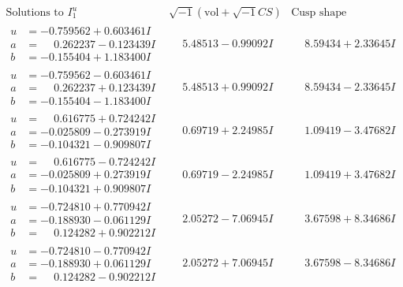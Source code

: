 \documentclass[1p]{elsarticle_modified}
\theoremstyle{definition}
\newcommand{\I}{\sqrt{-1}}
\begin{document}
$$\begin{array}{c|c|c}  
\text{Solutions to }I^u_{1}& \I (\text{vol} + \sqrt{-1}CS) & \text{Cusp shape}\\
 \hline 
\begin{aligned}
u &= -0.759562 + 0.603461 I \\
a &= \phantom{-}0.262237 - 0.123439 I \\
b &= -0.155404 + 1.183400 I\end{aligned}
 & \phantom{-}5.48513 - 0.99092 I & \phantom{-}8.59434 + 2.33645 I \\ \hline\begin{aligned}
u &= -0.759562 - 0.603461 I \\
a &= \phantom{-}0.262237 + 0.123439 I \\
b &= -0.155404 - 1.183400 I\end{aligned}
 & \phantom{-}5.48513 + 0.99092 I & \phantom{-}8.59434 - 2.33645 I \\ \hline\begin{aligned}
u &= \phantom{-}0.616775 + 0.724242 I \\
a &= -0.025809 - 0.273919 I \\
b &= -0.104321 - 0.909807 I\end{aligned}
 & \phantom{-}0.69719 + 2.24985 I & \phantom{-}1.09419 - 3.47682 I \\ \hline\begin{aligned}
u &= \phantom{-}0.616775 - 0.724242 I \\
a &= -0.025809 + 0.273919 I \\
b &= -0.104321 + 0.909807 I\end{aligned}
 & \phantom{-}0.69719 - 2.24985 I & \phantom{-}1.09419 + 3.47682 I \\ \hline\begin{aligned}
u &= -0.724810 + 0.770942 I \\
a &= -0.188930 - 0.061129 I \\
b &= \phantom{-}0.124282 + 0.902212 I\end{aligned}
 & \phantom{-}2.05272 - 7.06945 I & \phantom{-}3.67598 + 8.34686 I \\ \hline\begin{aligned}
u &= -0.724810 - 0.770942 I \\
a &= -0.188930 + 0.061129 I \\
b &= \phantom{-}0.124282 - 0.902212 I\end{aligned}
 & \phantom{-}2.05272 + 7.06945 I & \phantom{-}3.67598 - 8.34686 I \\ \hline\begin{aligned}

\end{aligned}
\end{array}$$
\end{document}
